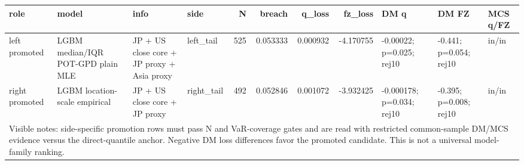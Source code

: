 \begin{tabular}{lll lrrrrlll}
\toprule
role & model & info & side & N & breach & q_loss & fz_loss & DM q & DM FZ & MCS q/FZ \\
\midrule
left promoted & LGBM median/IQR POT-GPD plain MLE & JP + US close core + JP proxy + Asia proxy & left\_tail & 525 & 0.053333 & 0.000932 & -4.170755 & -0.00022; p=0.025; rej10 & -0.441; p=0.054; rej10 & in/in \\
right promoted & LGBM location-scale empirical & JP + US close core + JP proxy & right\_tail & 492 & 0.052846 & 0.001072 & -3.932425 & -0.000178; p=0.034; rej10 & -0.395; p=0.008; rej10 & in/in \\
\midrule
\multicolumn{11}{l}{\footnotesize Visible notes: side-specific promotion rows must pass N and VaR-coverage gates and are read with restricted common-sample DM/MCS evidence versus the direct-quantile anchor. Negative DM loss differences favor the promoted candidate. This is not a universal model-family ranking.} \\
\bottomrule
\end{tabular}
